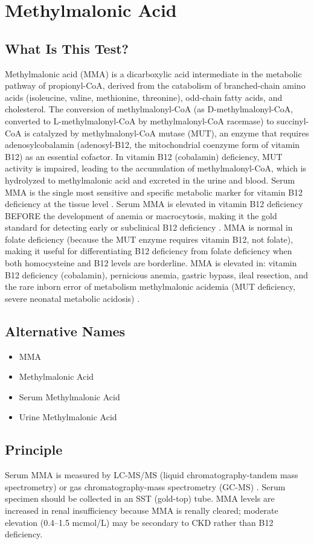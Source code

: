 \chapter{Methylmalonic Acid}
\section*{What Is This Test?}
Methylmalonic acid (MMA) is a dicarboxylic acid intermediate in the metabolic pathway of propionyl-CoA, derived from the catabolism of branched-chain amino acids (isoleucine, valine, methionine, threonine), odd-chain fatty acids, and cholesterol. The conversion of methylmalonyl-CoA (as D-methylmalonyl-CoA, converted to L-methylmalonyl-CoA by methylmalonyl-CoA racemase) to succinyl-CoA is catalyzed by methylmalonyl-CoA mutase (MUT), an enzyme that requires adenosylcobalamin (adenosyl-B12, the mitochondrial coenzyme form of vitamin B12) as an essential cofactor. In vitamin B12 (cobalamin) deficiency, MUT activity is impaired, leading to the accumulation of methylmalonyl-CoA, which is hydrolyzed to methylmalonic acid and excreted in the urine and blood. Serum MMA is the single most sensitive and specific metabolic marker for vitamin B12 deficiency at the tissue level \cite{savage1994sensitivity}. Serum MMA is elevated in vitamin B12 deficiency BEFORE the development of anemia or macrocytosis, making it the gold standard for detecting early or subclinical B12 deficiency \cite{stabler2013vitamin}. MMA is normal in folate deficiency (because the MUT enzyme requires vitamin B12, not folate), making it useful for differentiating B12 deficiency from folate deficiency when both homocysteine and B12 levels are borderline. MMA is elevated in: vitamin B12 deficiency (cobalamin), pernicious anemia, gastric bypass, ileal resection, and the rare inborn error of metabolism methylmalonic acidemia (MUT deficiency, severe neonatal metabolic acidosis) \cite{carmel2000current}.
\section*{Alternative Names}
\begin{itemize}
  \item MMA
  \item Methylmalonic Acid
  \item Serum Methylmalonic Acid
  \item Urine Methylmalonic Acid
\end{itemize}
\section*{Principle}
Serum MMA is measured by LC-MS/MS (liquid chromatography-tandem mass spectrometry) or gas chromatography-mass spectrometry (GC-MS) \cite{tietz2012textbook}. Serum specimen should be collected in an SST (gold-top) tube. MMA levels are increased in renal insufficiency because MMA is renally cleared; moderate elevation (0.4--1.5 mcmol/L) may be secondary to CKD rather than B12 deficiency.
